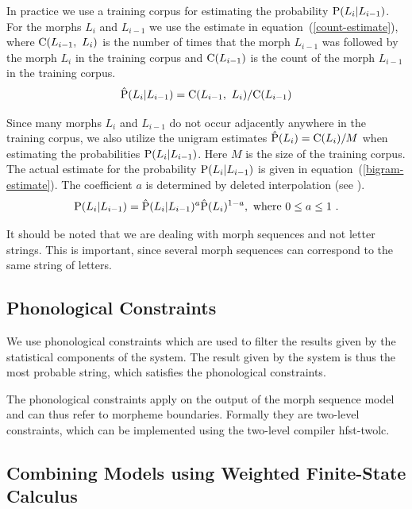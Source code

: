 \documentclass{llncs}
\begin{document}
In practice we use a training corpus for estimating the probability
${\rm P}(L_i | L_{i-1})$. For the morphs $L_i$ and $L_{i-1}$ we
use the estimate in equation~(\ref{count-estimate}), where ${\rm
  C}(L_{i-1},\ L_i)$ is the number of times that the morph $L_{i-1}$
was followed by the morph $L_i$ in the training corpus and ${\rm
  C}(L_{i-1})$ is the count of the morph $L_{i-1}$ in the training
corpus.
\begin{equation}\label{count-estimate}
{\rm \hat{P}}(L_i | L_{i-1}) = {\rm C}(L_{i - 1},\ L_i) / {\rm C}(L_{i-1})
\end{equation}

Since many morphs $L_i$ and $L_{i-1}$
do not occur adjacently anywhere in the training corpus, we also
utilize the unigram estimates ${\rm \hat{P}}(L_i) = {\rm C}(L_i)/M$
when estimating the probabilities ${\rm P}(L_i | L_{i-1})$. Here $M$
is the size of the training corpus. The actual estimate for the
probability ${\rm P}(L_i | L_{i-1})$ is given in
equation~(\ref{bigram-estimate}). The coefficient $a$ is determined by deleted interpolation (see \cite{Brants:2000}).
\begin{equation}\label{bigram-estimate}
{\rm P}(L_i | L_{i-1}) = {\rm \hat{P}}(L_i | L_{i-1})^a{\rm \hat{P}}(L_i)^{1 - a}{\rm,\ where }\ 0\leq a \leq 1\ {\rm.} 
\end{equation}

It should be noted that we are dealing with morph sequences and not
letter strings. This is important, since several morph sequences can
correspond to the same string of letters.

\subsection{Phonological Constraints}

We use phonological constraints which are used to filter the results
given by the statistical components of the system. The result given by
the system is thus the most probable string, which satisfies the
phonological constraints. 

The phonological constraints apply on the output of the morph sequence
model and can thus refer to morpheme boundaries. Formally they are
two-level constraints, which can be implemented using the two-level
compiler hfst-twolc.

\subsection{Combining Models using Weighted Finite-State Calculus}
\end{document}
